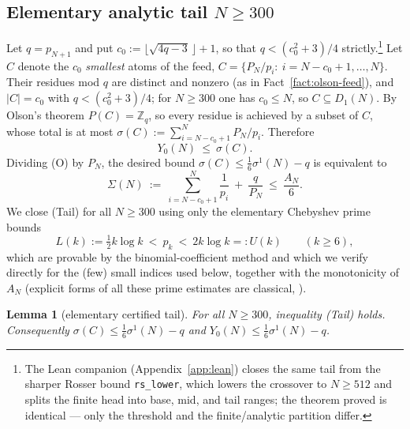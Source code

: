 \documentclass[11pt]{amsart}
\theoremstyle{plain}
\newtheorem{lemma}[theorem]{Lemma}
\theoremstyle{definition}
\newcommand{\Z}{\mathbb{Z}}
\begin{document}
\subsection{Elementary analytic tail \texorpdfstring{$N\ge 300$}{N >= 300}}
\label{ssec:tail}
Let $q=p_{N+1}$ and put $c_0:=\bigl\lfloor\sqrt{4q-3}\,\bigr\rfloor+1$, so that
$q<(c_0^2+3)/4$ strictly.\footnote{The Lean companion
(Appendix~\ref{app:lean}) closes the same tail from the sharper Rosser bound
\texttt{rs\_lower}, which lowers the crossover to $N\ge512$ and splits the finite head
into base, mid, and tail ranges; the theorem proved is identical --- only the threshold
and the finite/analytic partition differ.}  Let $C$ denote the $c_0$ \emph{smallest} atoms of the
feed, $C=\{P_N/p_i:\ i=N-c_0+1,\dots,N\}$.  Their residues mod $q$ are distinct
and nonzero (as in Fact~\ref{fact:olson-feed}), and $|C|=c_0$ with
$q<(c_0^2+3)/4$; for $N\ge 300$ one has $c_0\le N$, so $C\subseteq D_1(N)$.  By
Olson's theorem $P(C)=\Z_q$, so every residue is achieved by a subset of $C$,
whose total is at most $\sigma(C):=\sum_{i=N-c_0+1}^N P_N/p_i$.  Therefore
\[
Y_0(N)\ \le\ \sigma(C).
\tag{O}
\]
Dividing (O) by $P_N$, the desired bound $\sigma(C)\le\tfrac16\sigma^1(N)-q$ is
equivalent to
\[
\Sigma(N)\ :=\ \sum_{i=N-c_0+1}^{N}\frac{1}{p_i}\ +\ \frac{q}{P_N}
\ \le\ \frac{A_N}{6}.
\tag{Tail}
\]
We close (Tail) for all $N\ge 300$ using only the elementary Chebyshev prime bounds
\[
L(k):=\tfrac12 k\log k\ <\ p_k\ <\ 2k\log k=:U(k)\qquad(k\ge 6),
\tag{Ch}
\]
which are provable by the binomial-coefficient method and which we verify
directly for the (few) small indices used below, together with the monotonicity
of $A_N$ (explicit forms of all these prime estimates are classical,
\cite{RosserSchoenfeld1962}).

\begin{lemma}[elementary certified tail]\label{lem:tail-elem}
For all $N\ge 300$, inequality \textup{(Tail)} holds.  Consequently
$\sigma(C)\le\tfrac16\sigma^1(N)-q$ and $Y_0(N)\le\tfrac16\sigma^1(N)-q$.
\end{lemma}
\end{document}
